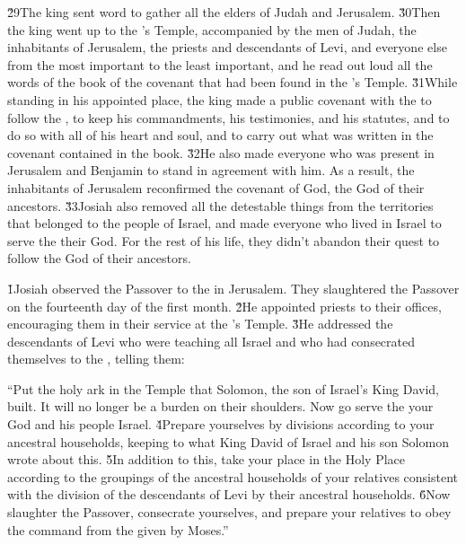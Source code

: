 \v{29}The king sent word to gather all the elders of Judah and Jerusalem. \v{30}Then the king went up to the 's Temple, accompanied by the men of Judah, the inhabitants of Jerusalem, the priests and descendants of Levi, and everyone else from the most important to the least important, and he read out loud all the words of the book of the covenant that had been found in the 's Temple. \v{31}While standing in his appointed place, the king made a public covenant with the  to follow the , to keep his commandments, his testimonies, and his statutes, and to do so with all of his heart and soul, and to carry out what was written in the covenant contained in the book. \v{32}He also made everyone who was present in Jerusalem and Benjamin to stand in agreement with him. As a result, the inhabitants of Jerusalem reconfirmed the covenant of God, the God of their ancestors. \v{33}Josiah also removed all the detestable things from the territories that belonged to the people of Israel, and made everyone who lived in Israel to serve the  their God. For the rest of his life, they didn't abandon their quest to follow the  God of their ancestors.

\v{1}Josiah observed the Passover to the  in Jerusalem. They slaughtered the Passover on the fourteenth day of the first month. \v{2}He appointed priests to their offices, encouraging them in their service at the 's Temple. \v{3}He addressed the descendants of Levi who were teaching all Israel and who had consecrated themselves to the , telling them:

\begin{poetry}
\poeml ``Put the holy ark in the Temple that Solomon, the son of Israel's King David, built. It will no longer be a burden on their shoulders. Now go serve the  your God and his people Israel. \v{4}Prepare yourselves by divisions according to your ancestral households, keeping to what King David of Israel and his son Solomon wrote about this. \v{5}In addition to this, take your place in the Holy Place according to the groupings of the ancestral households of your relatives consistent with the division of the descendants of Levi by their ancestral households. \v{6}Now slaughter the Passover, consecrate yourselves, and prepare your relatives to obey the command from the  given by Moses.''
\end{poetry}


